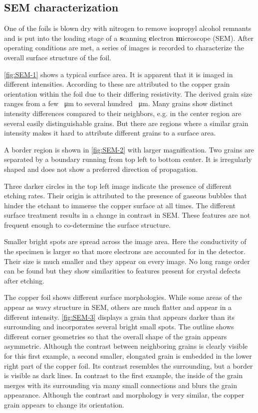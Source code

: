	\subsection{SEM characterization} 
	One of the foils is blown dry with nitrogen to remove isopropyl alcohol remnants and is put into the loading stage of a \textbf{s}canning \textbf{e}lectron \textbf{m}icroscope (SEM). After operating conditions are met, a series of images is recorded to characterize the overall surface structure of the foil. 
	
\autoref{fig:SEM-1} shows a typical surface area. It is apparent that it is imaged in different intensities. According to \cite{wu_effects_2015, wendt_correlation_2007, langlois_crystal_2015} these are attributed to the copper grain orientation within the foil due to their differing resistivity. The derived grain size ranges from a few \SI{}{\micro \meter} to several hundred \SI{}{\micro \meter}. Many grains show distinct intensity differences compared to their neighbors, e.g. in the center region are several easily distinguishable grains. But there are regions where a similar grain intensity makes it hard to attribute different grains to a surface area.
	
A border region is shown in \autoref{fig:SEM-2} with larger magnification. Two grains are separated by a boundary running from top left to bottom center. It is irregularly shaped and does not show a preferred direction of propagation.

Three darker circles in the top left image indicate the presence of different etching rates. Their origin is attributed to the presence of gaseous bubbles that hinder the etchant to immerse the copper surface at all times. The different surface treatment results in a change in contrast in SEM. These features are not frequent enough to co-determine the surface structure.

Smaller bright spots are spread across the image area. Here the conductivity of the specimen is larger so that more electrons are accounted for in the detector. Their size is much smaller and they appear on every image. No long range order can be found but they show similarities to features present for crystal defects after etching. 

The copper foil shows different surface morphologies. While some areas of the appear as  wavy structure in SEM, others are much flatter and appear in a different intensity. \autoref{fig:SEM-3} displays a grain that appears darker than its surrounding and  incorporates several bright small spots. The outline shows different corner geometries so that the overall shape of the grain appears asymmetric. Although the contrast between neighboring grains is clearly visible for this first example, a second smaller, elongated grain is embedded in the lower right part of the copper foil. Its contrast resembles the surrounding, but a border is visible as dark lines. In contrast to the first example, the inside of the grain merges with its surrounding via many small connections and blurs the grain appearance. Although the contrast and morphology is very similar, the copper grain appears to change its orientation.
	
